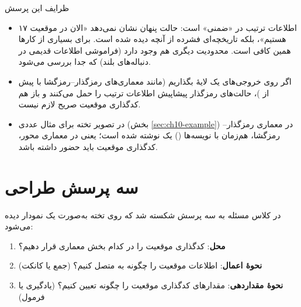 \begin{addedbox}{ظرایف این پرسش}
\begin{itemize}
  \item اطلاعات ترتیب در  «ضمنی» است: حالت پنهان نشان نمی‌دهد «الان در موقعیت ۱۷ هستیم»، بلکه تاریخچه‌ای فشرده از آنچه دیده شده است. برای بسیاری از کارها همین کافی است. محدودیت دیگری هم وجود دارد (فراموشی اطلاعات قدیمی در دنباله‌های بلند) که جدا بررسی می‌شود.
  \item اگر روی خروجی‌های  یک لایهٔ  بگذاریم (مانند معماری‌های رمزگذار--رمزگشا با  پیش از )، حالت‌های رمزگذار پیشاپیش اطلاعات ترتیب را حمل می‌کنند و باز هم کدگذاری موقعیت صریح لازم نیست.
  \item در تصویر تخته برای مثال عددی (بخش \ref{sec:ch10-example}) در معماری رمزگذار--رمزگشا، هم‌زمان با  نویسه‌ها () یک  نوشته شده است؛ یعنی در معماری ‌محور، کدگذاری موقعیت باید حضور داشته باشد.
\end{itemize}
\end{addedbox}

\section{سه پرسش طراحی}
در کلاس مسئله به سه پرسش شکسته شد که روی تخته به‌صورت یک نمودار دیده می‌شود:
\begin{enumerate}
  \item \textbf{محل}: کدگذاری موقعیت را در کدام بخش معماری قرار دهیم؟
  \item \textbf{نحوهٔ اعمال}: اطلاعات موقعیت را چگونه به  متصل کنیم؟ (جمع یا کانکت)
  \item \textbf{نحوهٔ مقداردهی}: مقدارهای کدگذاری موقعیت را چگونه تعیین کنیم؟ (یادگیری یا فرمول)
\end{enumerate}

